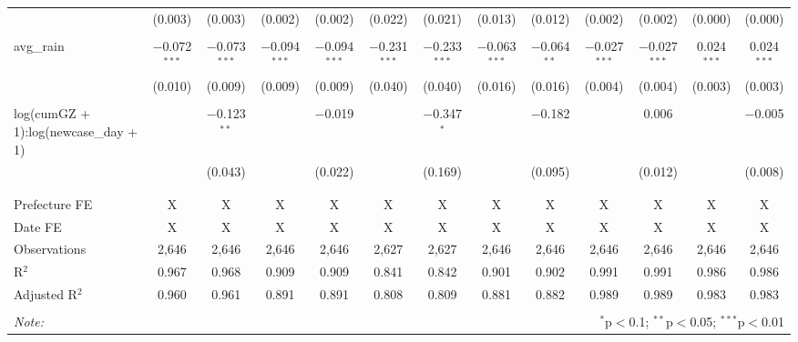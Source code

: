 \begin{table}[!htbp]
\begin{tabular}{@{\extracolsep{5pt}}lcccccccccccc}
  & (0.003) & (0.003) & (0.002) & (0.002) & (0.022) & (0.021) & (0.013) & (0.012) & (0.002) & (0.002) & (0.000) & (0.000) \\ 
  & & & & & & & & & & & & \\ 
 avg\_rain & $-$0.072$^{***}$ & $-$0.073$^{***}$ & $-$0.094$^{***}$ & $-$0.094$^{***}$ & $-$0.231$^{***}$ & $-$0.233$^{***}$ & $-$0.063$^{***}$ & $-$0.064$^{**}$ & $-$0.027$^{***}$ & $-$0.027$^{***}$ & 0.024$^{***}$ & 0.024$^{***}$ \\ 
  & (0.010) & (0.009) & (0.009) & (0.009) & (0.040) & (0.040) & (0.016) & (0.016) & (0.004) & (0.004) & (0.003) & (0.003) \\ 
  & & & & & & & & & & & & \\ 
 log(cumGZ + 1):log(newcase\_day + 1) &  & $-$0.123$^{**}$ &  & $-$0.019 &  & $-$0.347$^{*}$ &  & $-$0.182 &  & 0.006 &  & $-$0.005 \\ 
  &  & (0.043) &  & (0.022) &  & (0.169) &  & (0.095) &  & (0.012) &  & (0.008) \\ 
  & & & & & & & & & & & & \\ 
\hline \\[-1.8ex] 
Prefecture FE & X & X & X & X & X & X & X & X & X & X & X & X \\ 
Date FE & X & X & X & X & X & X & X & X & X & X & X & X \\ 
Observations & 2,646 & 2,646 & 2,646 & 2,646 & 2,627 & 2,627 & 2,646 & 2,646 & 2,646 & 2,646 & 2,646 & 2,646 \\ 
R$^{2}$ & 0.967 & 0.968 & 0.909 & 0.909 & 0.841 & 0.842 & 0.901 & 0.902 & 0.991 & 0.991 & 0.986 & 0.986 \\ 
Adjusted R$^{2}$ & 0.960 & 0.961 & 0.891 & 0.891 & 0.808 & 0.809 & 0.881 & 0.882 & 0.989 & 0.989 & 0.983 & 0.983 \\ 
\hline 
\hline \\[-1.8ex] 
\textit{Note:}  & \multicolumn{12}{r}{$^{*}$p$<$0.1; $^{**}$p$<$0.05; $^{***}$p$<$0.01} \\ 
\end{tabular} 
\end{table} 
